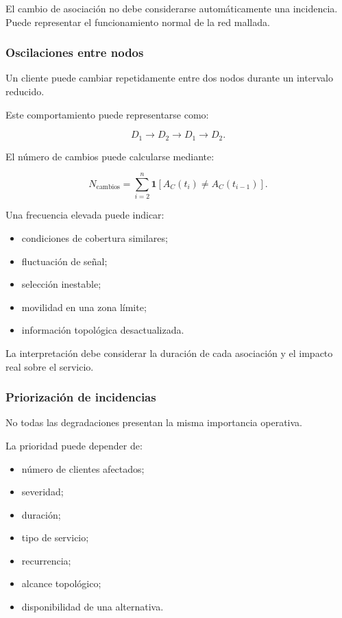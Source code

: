 El cambio de asociación no debe considerarse automáticamente una
incidencia. Puede representar el funcionamiento normal de la red
mallada.


\subsubsection*{Oscilaciones entre nodos}

Un cliente puede cambiar repetidamente entre dos nodos durante un
intervalo reducido.

Este comportamiento puede representarse como:

\[
    D_1
    \longrightarrow
    D_2
    \longrightarrow
    D_1
    \longrightarrow
    D_2.
\]

El número de cambios puede calcularse mediante:

\[
    N_{\mathrm{cambios}}
    =
    \sum_{i=2}^{n}
    \mathbf{1}
    \left[
        A_C(t_i)
        \neq
        A_C(t_{i-1})
    \right].
\]

Una frecuencia elevada puede indicar:

\begin{itemize}
    \item condiciones de cobertura similares;

    \item fluctuación de señal;

    \item selección inestable;

    \item movilidad en una zona límite;

    \item información topológica desactualizada.
\end{itemize}

La interpretación debe considerar la duración de cada asociación y el
impacto real sobre el servicio.


\subsubsection*{Priorización de incidencias}

No todas las degradaciones presentan la misma importancia operativa.

La prioridad puede depender de:

\begin{itemize}
    \item número de clientes afectados;

    \item severidad;

    \item duración;

    \item tipo de servicio;

    \item recurrencia;

    \item alcance topológico;

    \item disponibilidad de una alternativa.
\end{itemize}


